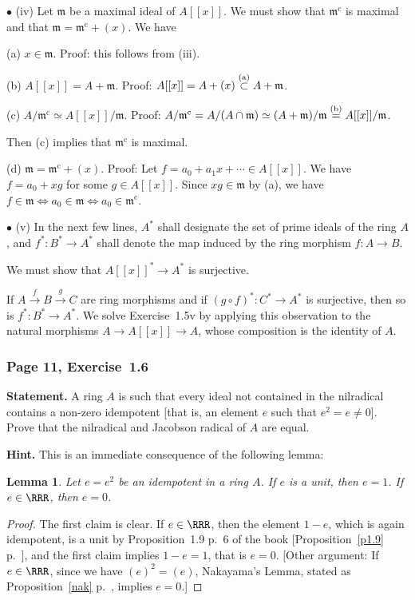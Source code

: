 \documentclass[12pt,letterpaper]{article}%
\newcommand{\oo}{\operatorname}\newcommand{\ooo}{\operatorname*}
\newcommand{\mf}{\mathfrak}
\newcommand{\mmm}{\mf m}
\newcommand{\bu}{\bullet}
\newcommand{\nn}{\noindent}
\newtheorem{lem}[thm]{Lemma}
\begin{document}
\nn$\bu$ (iv) Let $\mmm$ be a maximal ideal of $A[[x]]$. We must show that $\mmm^{\oo c}$ is maximal and that $\mmm=\mmm^{\oo c}+(x)$. We have 

\nn(a) $x\in\mmm$. Proof: this follows from (iii).%

\nn(b) $A[[x]]=A+\mmm$. Proof: $A[[x]]=A+(x)\overset{(\text a)}\subset A+\mmm$.

\nn(c) $A/\mmm^{\oo c}\simeq A[[x]]/\mmm$. Proof: $A/\mmm^{\oo c}=A/(A\cap\mmm)\simeq(A+\mmm)/\mmm\overset{(\text b)}=A[[x]]/\mmm$. 

Then (c) implies that $\mmm^{\oo c}$ is maximal.

\nn(d) $\mmm=\mmm^{\oo c}+(x)$. Proof: Let $f=a_0+a_1x+\cdots\in A[[x]]$. We have  $f=a_0+xg$ for some $g\in A[[x]]$. Since $xg\in\mmm$ by (a), we have $f\in\mmm\iff a_0\in\mmm\iff a_0\in\mmm^{\oo c}$. 

\nn$\bu$ (v) In the next few lines, $A^*$ shall designate the set of prime ideals of the ring $A$, and $f^*:B^*\to A^*$ shall denote the map induced by the ring morphism $f:A\to B$. 

We must show that $A[[x]]^*\to A^*$ is surjective.

If $A\xrightarrow fB\xrightarrow gC$ are ring morphisms and if $(g\circ f)^*:C^*\to A^*$ is surjective, then so is $f^*:B^*\to A^*$. We solve Exercise~1.5v by applying this observation to the natural morphisms $A\to A[[x]]\to A$, whose composition is the identity of $A$. 

\subsubsection{Page 11, Exercise~1.6}%

\textbf{Statement.} A ring $A$ is such that every ideal not contained in the nilradical contains a non-zero idempotent [that is, an element $e$ such that $e^2=e\ne0$]. Prove that the nilradical and Jacobson radical of $A$ are equal.

\nn\textbf{Hint.} This is an immediate consequence of the following lemma:

\begin{lem}\label{idemjac}
Let $e=e^2$ be an idempotent in a ring $A$. If $e$ is a unit, then $e=1$. If $e\in\RRR$, then $e=0$.%
\end{lem}
\begin{proof}
The first claim is clear. If $e\in\RRR$, then the element $1-e$, which is again idempotent, is a unit by Proposition~1.9 p.~6 of the book [Proposition~\ref{p1.9} p.~\pageref{p1.9}], and the first claim implies $1-e=1$, that is $e=0$. [Other argument: If $e\in\RRR$, since we have $(e)^2=(e)$, Nakayama's Lemma, stated as Proposition~\ref{nak} p.~\pageref{nak}, implies $e=0$.]
\end{proof}
\end{document}
